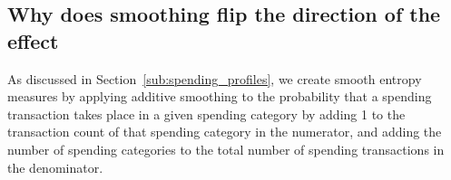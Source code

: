 









\subsection{Why does smoothing flip the direction of the effect}%
\label{sub:why_does_smoothing_flip_the_direction_of_the_effect}

As discussed in Section~\ref{sub:spending_profiles}, we create smooth entropy
measures by applying additive smoothing to the probability that a spending
transaction takes place in a given spending category by adding 1 to the
transaction count of that spending category in the numerator, and adding the
number of spending categories to the total number of spending transactions in
the denominator.


